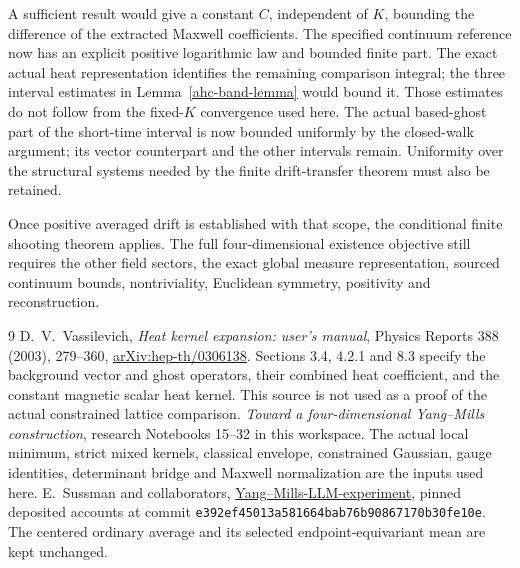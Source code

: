 \documentclass[11pt]{article}
\theoremstyle{remark}
\begin{document}
A sufficient result would give a constant \(C\), independent
of \(K\), bounding the difference of the extracted
Maxwell coefficients. The specified continuum reference
now has an explicit positive logarithmic law and bounded
finite part. The exact actual heat representation identifies
the remaining comparison integral; the three interval
estimates in Lemma~\ref{ahc-band-lemma} would bound it.
Those estimates do not follow from the fixed-\(K\)
convergence used here. The actual based-ghost part of
the short-time interval is now bounded uniformly by
the closed-walk argument; its vector counterpart and
the other intervals remain. Uniformity over
the structural systems needed by the finite drift-transfer
theorem must also be retained.

Once positive averaged drift is established with that
scope, the conditional finite shooting theorem applies.
The full four-dimensional existence objective still
requires the other field sectors, the exact global
measure representation, sourced continuum bounds,
nontriviality, Euclidean symmetry, positivity and
reconstruction.

\begin{thebibliography}{9}
D.~V.~Vassilevich,
\emph{Heat kernel expansion: user's manual},
Physics Reports 388 (2003), 279--360,
\href{https://arxiv.org/abs/hep-th/0306138}{arXiv:hep-th/0306138}.
Sections 3.4, 4.2.1 and 8.3 specify the background vector
and ghost operators, their combined heat coefficient,
and the constant magnetic scalar heat kernel.
This source is not used as a proof of the actual constrained
lattice comparison.
\emph{Toward a four-dimensional Yang--Mills construction},
research Notebooks 15--32 in this workspace.
The actual local minimum, strict mixed kernels, classical
envelope, constrained Gaussian, gauge identities, determinant
bridge and Maxwell normalization are the inputs used here.
E.~Sussman and collaborators,
\href{https://github.com/ethanwsussman/Yang--Mills-LLM-experiment}
{Yang--Mills-LLM-experiment}, pinned deposited accounts at
commit \texttt{e392ef45013a581664bab76b90867170b30fe10e}.
The centered ordinary average and its selected
endpoint-equivariant mean are kept unchanged.
\end{thebibliography}
\end{document}
